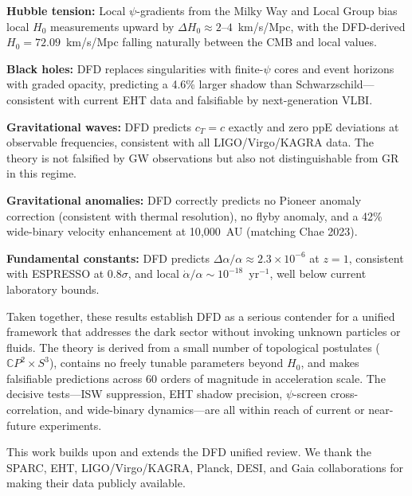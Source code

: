 \documentclass[aps,prd,twocolumn,superscriptaddress,nofootinbib]{revtex4-2}
\begin{document}
\textbf{Hubble tension:} Local $\psi$-gradients from the Milky Way
and Local Group bias local $H_0$ measurements upward by
$\Delta H_0 \approx 2$--$4$~km/s/Mpc, with the DFD-derived
$H_0 = 72.09$~km/s/Mpc falling naturally between the CMB and
local values.

\textbf{Black holes:} DFD replaces singularities with finite-$\psi$
cores and event horizons with graded opacity, predicting a 4.6\%
larger shadow than Schwarzschild---consistent with current EHT
data and falsifiable by next-generation VLBI.

\textbf{Gravitational waves:} DFD predicts $c_T = c$ exactly and
zero ppE deviations at observable frequencies, consistent with
all LIGO/Virgo/KAGRA data. The theory is not falsified by GW
observations but also not distinguishable from GR in this regime.

\textbf{Gravitational anomalies:} DFD correctly predicts no Pioneer
anomaly correction (consistent with thermal resolution), no flyby
anomaly, and a 42\% wide-binary velocity enhancement at 10{,}000~AU
(matching Chae 2023).

\textbf{Fundamental constants:} DFD predicts $\Delta\alpha/\alpha
\approx 2.3\times 10^{-6}$ at $z = 1$, consistent with ESPRESSO
at $0.8\sigma$, and local $\dot\alpha/\alpha \sim 10^{-18}$~yr$^{-1}$,
well below current laboratory bounds.

Taken together, these results establish DFD as a serious contender
for a unified framework that addresses the dark sector without
invoking unknown particles or fluids. The theory is derived from
a small number of topological postulates ($\mathbb{C}P^2 \times S^3$),
contains no freely tunable parameters beyond $H_0$, and makes
falsifiable predictions across 60 orders of magnitude in acceleration
scale. The decisive tests---ISW suppression, EHT shadow precision,
$\psi$-screen cross-correlation, and wide-binary dynamics---are all
within reach of current or near-future experiments.

\begin{acknowledgments}
This work builds upon and extends the DFD unified review. We thank
the SPARC, EHT, LIGO/Virgo/KAGRA, Planck, DESI, and Gaia
collaborations for making their data publicly available.
\end{acknowledgments}
\end{document}
